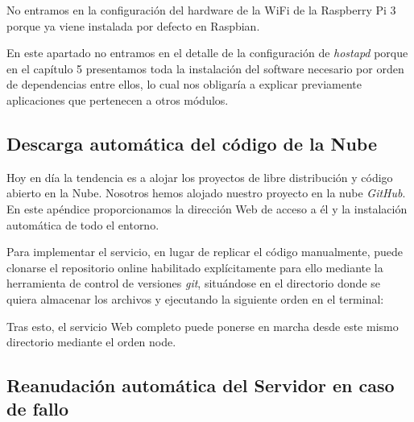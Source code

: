 \begin{appendices}
No entramos en la configuración del hardware de la WiFi de la Raspberry Pi 3 porque ya viene instalada por defecto en Raspbian.

En este apartado no entramos en el detalle de la configuración de \emph{hostapd} porque en el capítulo 5 presentamos toda la instalación del software necesario por orden de dependencias entre ellos, lo cual nos obligaría a explicar previamente aplicaciones que pertenecen a otros módulos.
\cleardoublepage
{}%
\begin{center}
\begin{minipage}{.75\textwidth}
\section{Descarga automática del código de la Nube}\label{ApendiceB}

Hoy en día la tendencia es a alojar los proyectos de libre distribución y código abierto en la Nube. Nosotros hemos alojado nuestro proyecto en la nube \emph{GitHub}. En este apéndice proporcionamos la dirección Web de acceso a él y la instalación automática de todo el entorno.
\end{minipage}
\end{center}
\clearpage%

Para implementar el servicio, en lugar de replicar el código manualmente, puede clonarse el repositorio online habilitado explícitamente para ello mediante la herramienta de control de versiones \emph{git}, situándose en el directorio donde se quiera almacenar los archivos y ejecutando la siguiente orden en el terminal: 


Tras esto, el servicio Web completo puede ponerse en marcha desde este mismo directorio mediante el orden node.

\cleardoublepage
{}%
\begin{center}
\begin{minipage}{.75\textwidth}

\section{Reanudación automática del Servidor en caso de fallo}\label{ApendiceC}


\end{minipage}
\end{center}
\end{appendices}
